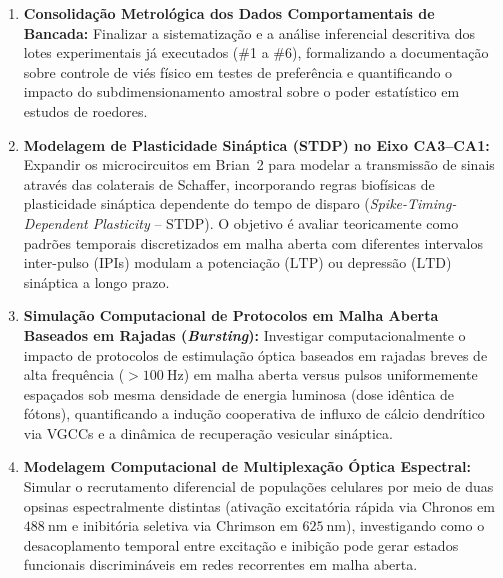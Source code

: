 \documentclass[11pt,a4paper,article,brazil]{abntex2}
\begin{document}
\begin{enumerate}
    \item \textbf{Consolidação Metrológica dos Dados Comportamentais de Bancada:} Finalizar a sistematização e a análise inferencial descritiva dos lotes experimentais já executados (\#1 a \#6), formalizando a documentação sobre controle de viés físico em testes de preferência e quantificando o impacto do subdimensionamento amostral sobre o poder estatístico em estudos de roedores.
    \item \textbf{Modelagem de Plasticidade Sináptica (STDP) no Eixo CA3--CA1:} Expandir os microcircuitos em \textsf{Brian~2} para modelar a transmissão de sinais através das colaterais de Schaffer, incorporando regras biofísicas de plasticidade sináptica dependente do tempo de disparo (\emph{Spike-Timing-Dependent Plasticity} -- STDP). O objetivo é avaliar teoricamente como padrões temporais discretizados em malha aberta com diferentes intervalos inter-pulso (IPIs) modulam a potenciação ($\text{LTP}$) ou depressão ($\text{LTD}$) sináptica a longo prazo.
    \item \textbf{Simulação Computacional de Protocolos em Malha Aberta Baseados em Rajadas (\emph{Bursting}):} Investigar computacionalmente o impacto de protocolos de estimulação óptica baseados em rajadas breves de alta frequência ($> \qty{100}{\hertz}$) em malha aberta versus pulsos uniformemente espaçados sob mesma densidade de energia luminosa (dose idêntica de fótons), quantificando a indução cooperativa de influxo de cálcio dendrítico via VGCCs e a dinâmica de recuperação vesicular sináptica.
    \item \textbf{Modelagem Computacional de Multiplexação Óptica Espectral:} Simular o recrutamento diferencial de populações celulares por meio de duas opsinas espectralmente distintas (ativação excitatória rápida via Chronos em $\qty{488}{\nano\meter}$ e inibitória seletiva via Chrimson em $\qty{625}{\nano\meter}$), investigando como o desacoplamento temporal entre excitação e inibição pode gerar estados funcionais discrimináveis em redes recorrentes em malha aberta.
\end{enumerate}





\newpage
\end{document}
